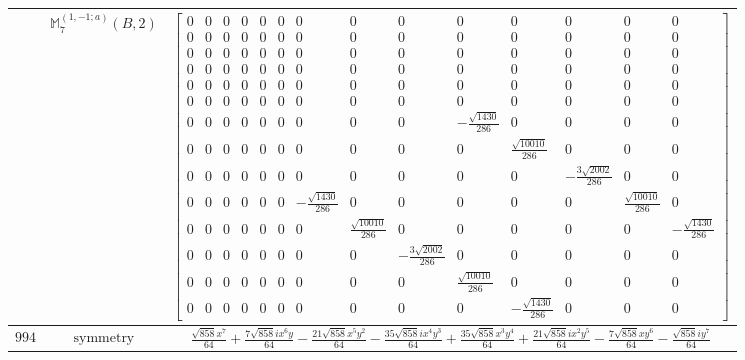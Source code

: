 \documentclass[fleqn,8pt,landscape]{jsarticle}
\begin{document}
\begin{longtable}{ccc}
$  $ & $ \mathbb{M}_{7}^{(1,-1;a)}(B,2) $ & $ \begin{bmatrix} 0 & 0 & 0 & 0 & 0 & 0 & 0 & 0 & 0 & 0 & 0 & 0 & 0 & 0 \\ 0 & 0 & 0 & 0 & 0 & 0 & 0 & 0 & 0 & 0 & 0 & 0 & 0 & 0 \\ 0 & 0 & 0 & 0 & 0 & 0 & 0 & 0 & 0 & 0 & 0 & 0 & 0 & 0 \\ 0 & 0 & 0 & 0 & 0 & 0 & 0 & 0 & 0 & 0 & 0 & 0 & 0 & 0 \\ 0 & 0 & 0 & 0 & 0 & 0 & 0 & 0 & 0 & 0 & 0 & 0 & 0 & 0 \\ 0 & 0 & 0 & 0 & 0 & 0 & 0 & 0 & 0 & 0 & 0 & 0 & 0 & 0 \\ 0 & 0 & 0 & 0 & 0 & 0 & 0 & 0 & 0 & - \frac{\sqrt{1430}}{286} & 0 & 0 & 0 & 0 \\ 0 & 0 & 0 & 0 & 0 & 0 & 0 & 0 & 0 & 0 & \frac{\sqrt{10010}}{286} & 0 & 0 & 0 \\ 0 & 0 & 0 & 0 & 0 & 0 & 0 & 0 & 0 & 0 & 0 & - \frac{3 \sqrt{2002}}{286} & 0 & 0 \\ 0 & 0 & 0 & 0 & 0 & 0 & - \frac{\sqrt{1430}}{286} & 0 & 0 & 0 & 0 & 0 & \frac{\sqrt{10010}}{286} & 0 \\ 0 & 0 & 0 & 0 & 0 & 0 & 0 & \frac{\sqrt{10010}}{286} & 0 & 0 & 0 & 0 & 0 & - \frac{\sqrt{1430}}{286} \\ 0 & 0 & 0 & 0 & 0 & 0 & 0 & 0 & - \frac{3 \sqrt{2002}}{286} & 0 & 0 & 0 & 0 & 0 \\ 0 & 0 & 0 & 0 & 0 & 0 & 0 & 0 & 0 & \frac{\sqrt{10010}}{286} & 0 & 0 & 0 & 0 \\ 0 & 0 & 0 & 0 & 0 & 0 & 0 & 0 & 0 & 0 & - \frac{\sqrt{1430}}{286} & 0 & 0 & 0 \end{bmatrix} $ \\ \hline
$ 994 $ & $ \text{symmetry} $ & $ \frac{\sqrt{858} x^{7}}{64} + \frac{7 \sqrt{858} i x^{6} y}{64} - \frac{21 \sqrt{858} x^{5} y^{2}}{64} - \frac{35 \sqrt{858} i x^{4} y^{3}}{64} + \frac{35 \sqrt{858} x^{3} y^{4}}{64} + \frac{21 \sqrt{858} i x^{2} y^{5}}{64} - \frac{7 \sqrt{858} x y^{6}}{64} - \frac{\sqrt{858} i y^{7}}{64} $ \\

\end{longtable}
\end{document}
